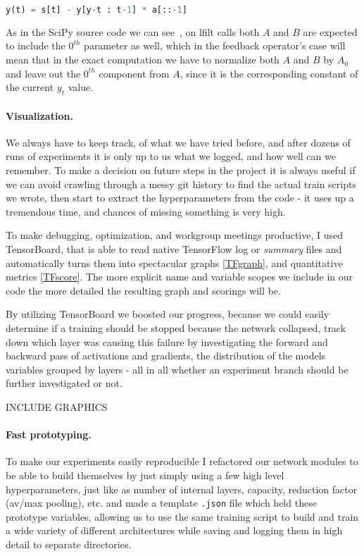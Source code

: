 \begin{lstlisting}[language=Python]
y(t) = s[t] - y[y-t : t-1] * a[::-1]
\end{lstlisting}

As in the SciPy source code we can see~\cite{scipy-github}, on lfilt calls both $A$ and $B$ are expected to include the $0^{th}$ parameter as well, which in the feedback operator's case will mean that in the exact computation we have to normalize both $A$ and $B$ by $A_0$ and leave out the $0^{th}$ component from $A$, since it is the corresponding constant of the current $y_t$ value.

\paragraph{Visualization.}
We always have to keep track, of what we have tried before, and after dozens of runs of experiments it is only up to us what we logged, and how well can we remember.
To make a decision on future steps in the project it is always useful if we can avoid crawling through a messy git history to find the actual train scripts we wrote, then start to extract the hyperparameters from the code - it uses up a tremendous time, and chances of missing something is very high.

To make debugging, optimization, and workgroup meetings productive, I used TensorBoard, that is able to read native TensorFlow log or \textit{summary} files and automatically turns them into spectacular graphs \ref{TFgraph}, and quantitative metrics \ref{TFscore}.
The more explicit name and variable scopes we include in our code the more detailed the resulting graph and scorings will be.

By utilizing TensorBoard we boosted our progress, because we could easily determine if a training should be stopped because the network collapsed, track down which layer was causing this failure by investigating the forward and backward pass of activations and gradients, the distribution of the models variables grouped by layers - all in all whether an experiment branch should be further investigated or not.

INCLUDE GRAPHICS

\paragraph{Fast prototyping.}
To make our experiments easily reproducible I refactored our network modules to be able to build themselves by just simply using a few high level hyperparameters, just like as number of internal layers, capacity, reduction factor (av/max pooling), etc. and made a template \texttt{.json} file which held these prototype variables, allowing us to use the same training script to build and train a wide variety of different architectures while saving and logging them in high detail to separate directories.

